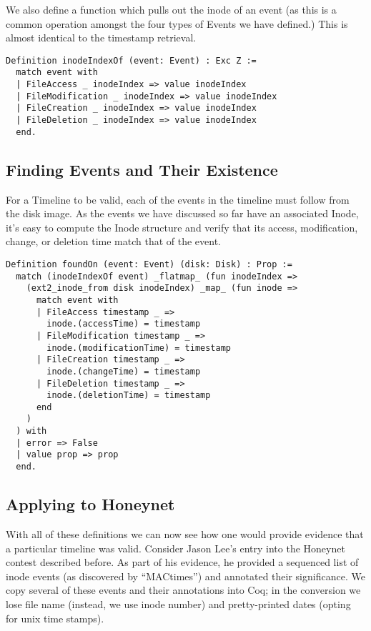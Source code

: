 \documentclass[nocopyrightspace]{sigplanconf}
\begin{document}
We also define a function which pulls out the inode of an event (as this is a
common operation amongst the four types of Events we have defined.) This is
almost identical to the timestamp retrieval. 

\begin{lstlisting}
Definition inodeIndexOf (event: Event) : Exc Z :=
  match event with
  | FileAccess _ inodeIndex => value inodeIndex
  | FileModification _ inodeIndex => value inodeIndex
  | FileCreation _ inodeIndex => value inodeIndex
  | FileDeletion _ inodeIndex => value inodeIndex
  end.
\end{lstlisting}

\subsection{Finding Events and Their Existence}

For a Timeline to be valid, each of the events in the timeline must follow
from the disk image. As the events we have discussed so far have an associated
Inode, it's easy to compute the Inode structure and verify that its access,
modification, change, or deletion time match that of the event.

\begin{lstlisting}
Definition foundOn (event: Event) (disk: Disk) : Prop :=
  match (inodeIndexOf event) _flatmap_ (fun inodeIndex =>
    (ext2_inode_from disk inodeIndex) _map_ (fun inode =>
      match event with
      | FileAccess timestamp _ => 
        inode.(accessTime) = timestamp
      | FileModification timestamp _ => 
        inode.(modificationTime) = timestamp
      | FileCreation timestamp _ => 
        inode.(changeTime) = timestamp
      | FileDeletion timestamp _ => 
        inode.(deletionTime) = timestamp
      end
    )
  ) with
  | error => False
  | value prop => prop
  end.
\end{lstlisting}

\subsection{Applying to Honeynet}
With all of these definitions we can now see how one would provide evidence
that a particular timeline was valid. Consider Jason Lee's entry\cite{lee}
into the Honeynet contest described before. As part of his evidence, he
provided a sequenced list of inode events (as discovered by ``MACtimes'') and
annotated their significance. We copy several of these events and their
annotations into Coq; in the conversion we lose file name (instead, we use
inode number) and pretty-printed dates (opting for unix time stamps).
\end{document}
